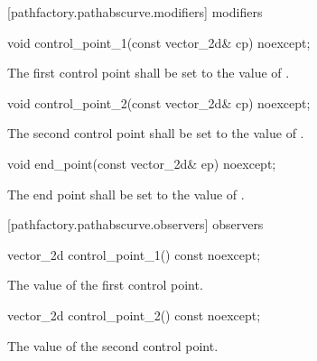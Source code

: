  [pathfactory.pathabscurve.modifiers]{ modifiers}

\begin{itemdecl}
    void control_point_1(const vector_2d& cp) noexcept;
\end{itemdecl}
\begin{itemdescr}
	\pnum
	\effects
	The first control point shall be set to the value of .
\end{itemdescr}

\begin{itemdecl}
    void control_point_2(const vector_2d& cp) noexcept;
\end{itemdecl}
\begin{itemdescr}
	\pnum
	\effects
	The second control point shall be set to the value of .
\end{itemdescr}

\begin{itemdecl}
    void end_point(const vector_2d& ep) noexcept;
\end{itemdecl}
\begin{itemdescr}
	\pnum
	\effects
	The end point shall be set to the value of .
\end{itemdescr}

 [pathfactory.pathabscurve.observers]{ observers}

\begin{itemdecl}
    vector_2d control_point_1() const noexcept;
\end{itemdecl}
\begin{itemdescr}
	\pnum
	\returns
	The value of the first control point.
\end{itemdescr}

\begin{itemdecl}
    vector_2d control_point_2() const noexcept;
\end{itemdecl}
\begin{itemdescr}
	\pnum
	\returns
	The value of the second control point.
\end{itemdescr}

